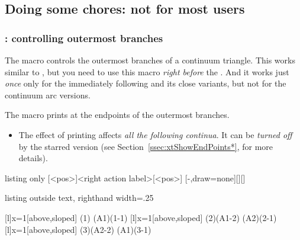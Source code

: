 \subsection{Doing some chores: not for most users}

\subsubsection{\protect\cmd{\cntmistb}: controlling outermost branches}

The macro \icmd{\cntmistb} controls the outermost branches of a continuum triangle.
This works similar to \cmd{\istb}, but you need to use this macro \emph{right before} the \cmd{\istrootcntm}.
And it works just \emph{once} only for the immediately following \cmd{\istrootcntm} and its close variants, but not for the continuum arc versions.

\remark
The macro \icmd{\cntmistb*} prints  at the endpoints of the outermost branches.
\begin{itemize}\tightlist
\item The effect of printing  affects \emph{all the following continua}.
It can be \emph{turned off} by the starred version \icmd{\xtHideEndPoints*} (see Section~\ref{ssec:xtShowEndPoints*}, for more details).
\end{itemize}

\begin{tcblisting}{listing only}
  [<pos>]{<right action label>}[<pos>]
  [-,draw=none]{}[]{}[]
\end{tcblisting}

\begin{tcblisting}{listing outside text, righthand width=.25\linewidth}
\begin{istgame}[font=\scriptsize]
\cntmdistance*{10mm}{20mm}{3mm}
[l]{x=1}[above,sloped]
\istrootcntm(1)
  \istb \istbm \endist
\istroot(A1)(1-1)
  \istb \istb \endist
{}[l]{x=1}[above,sloped]
\istrootcntm(2)(A1-2)
  \istb \istbm \endist
\istroot(A2)(2-1)
  \istb \istb \endist
{}
[l]{x=1}[above,sloped]
\istrootcntm(3)(A2-2)
  \istb \istbm \endist
\istroot(A1)(3-1)
  \istb \istb \endist
\end{istgame}
\end{tcblisting}

